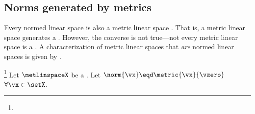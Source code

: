 \subsection{Norms generated by metrics}
Every normed linear space is also a metric linear space . 
That is, a metric linear space generates a .
However, the converse is not true---not every metric linear space is a .
A characterization of metric linear spaces that \emph{are} normed linear spaces is given by .
\begin{lemma}
\footnote{
  }
\label{lem:vsn_ti}
Let $\metlinspaceX$ be a .
Let $\norm{\vx}\eqd \metric{\vx}{\vzero}$ $\forall\vx\in\setX$.
\end{lemma}
